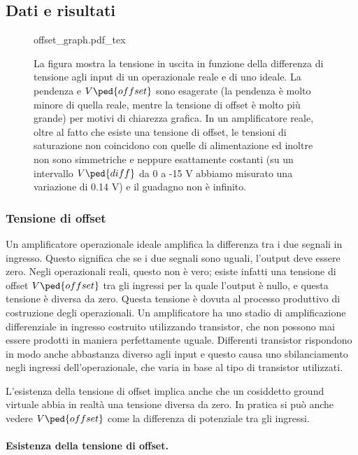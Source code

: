 \subsection{Dati e risultati}

\begin{figure}[t!]
    \def\svgwidth{0.5\textwidth}
    {offset_graph.pdf_tex}
    \caption{La figura mostra la tensione in uscita in funzione della differenza di tensione agli input di 
        un operazionale reale e di uno ideale. La pendenza e $V\ped{offset}$ sono esagerate
        (la pendenza è molto minore di quella reale, mentre la tensione di offset è molto più grande) per
        motivi di chiarezza grafica. In un amplificatore reale, oltre
        al fatto che esiste una tensione di offset, le tensioni di saturazione non coincidono con quelle
        di alimentazione ed inoltre non sono simmetriche e neppure esattamente costanti (su un intervallo
        $V\ped{diff}$ da 0 a -15 V abbiamo misurato una variazione di 0.14 V) e il guadagno non è infinito. }
    \label{fig:v_offset_graph2}
\end{figure}

\subsubsection{Tensione di offset}

Un amplificatore operazionale ideale amplifica la differenza tra i due segnali
in ingresso. Questo significa che se i due segnali sono uguali, l'output deve essere zero.
Negli operazionali reali, questo non è vero; esiste infatti una tensione di offset
$V\ped{offset}$ tra gli ingressi per la quale l'output è nullo, e questa tensione è diversa da zero.
Questa tensione è dovuta al processo produttivo di costruzione degli operazionali.
Un amplificatore ha uno stadio di amplificazione differenziale in ingresso costruito utilizzando
transistor, che non possono mai essere prodotti in maniera perfettamente uguale. Differenti
transistor rispondono in modo anche abbastanza diverso agli input e questo causa uno sbilanciamento
negli ingressi dell'operazionale, che varia in base al tipo di transistor utilizzati.

L'esistenza della tensione di offset implica anche che un cosiddetto ground virtuale
abbia in realtà una tensione diversa da zero. In pratica si può anche vedere $V\ped{offset}$
come la differenza di potenziale tra gli ingressi.

\paragraph{Esistenza della tensione di offset.}

